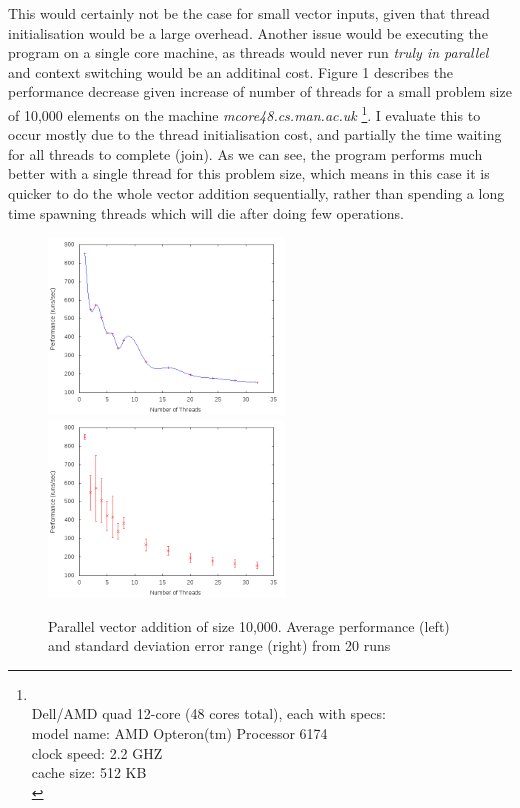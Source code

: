 \documentclass{article}
\begin{document}
  This would certainly not be the case for small vector inputs, given that thread initialisation would be a large overhead.
  Another issue would be executing the program on a single core machine, as threads would never run \textit{truly in parallel} and context switching would be an additinal cost.
  Figure 1 describes the performance decrease given increase of number of threads for a small problem size of 10,000 elements on the machine \textit{mcore48.cs.man.ac.uk}  \footnote{\label{machinespecs} \\
  Dell/AMD quad 12-core (48 cores total), each with specs:\\
  model name: AMD Opteron(tm) Processor 6174 \\
  clock speed: 2.2 GHZ \\
  cache size: 512 KB \\}. I evaluate this to occur mostly due to the thread initialisation cost, and partially the time waiting for all threads to complete (join). As we can see, the program performs much better with a single thread for this problem size, which means in this case it is quicker to do the whole vector addition sequentially, rather than spending a long time spawning threads which will die after doing few operations.
\newpage
\begin{figure}[t]
\centerline{%
\includegraphics[width=0.56\textwidth]{10k_lines}%
\includegraphics[width=0.56\textwidth]{10k_errorbars}%
}%
\caption{Parallel vector addition of size 10,000. Average performance (left) and standard deviation error range (right) from 20 runs}
\end{figure}
  
\end{document}
